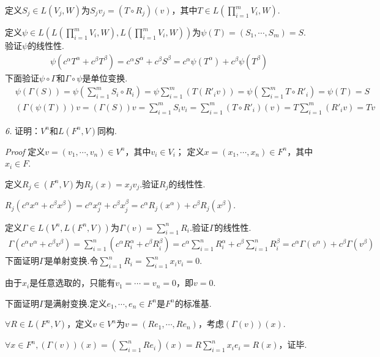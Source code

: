 定义\(S_j \in L(V_j,W)\)为\(S_jv_j=(T \circ R_j)(v)\)，其中\(T \in L(\prod_{i=1}^m V_i,W)\).

定义\(\psi \in L(L(\prod_{i=1}^m V_i,W),L(\prod_{i=1}^m V_i,W))\)为\(\psi(T)=(S_1,\cdots,S_m)=S\).验证\(\psi\)的线性性.
    \begin{align*}
        \psi(c^\alpha T^\alpha+c^\beta T^\beta)=c^\alpha S^\alpha+c^\beta S^\beta
        =c^\alpha \psi(T^\alpha)+c^\beta \psi(T^\beta)
    \end{align*}
下面验证\(\psi \circ \Gamma\)和\(\Gamma \circ \psi\)是单位变换.
    \begin{align*}
        &\psi(\Gamma(S))=\psi(\sum_{i=1}^m S_i \circ R_i)=\psi \sum_{i=1}^m (T(R'_iv))
        =\psi(\sum_{i=1}^m T \circ R'_i)=\psi(T)=S \\
        &(\Gamma(\psi(T)))v=(\Gamma(S))v=\sum_{i=1}^m S_iv_i
        =\sum_{i=1}^m (T \circ R'_i)(v)=T\sum_{i=1}^m (R'_iv)=Tv
    \end{align*}

\newpage

\textit{6.}
证明：\(V^n\)和\(L(F^n,V)\)同构.

\textit{Proof}
定义\(v=(v_1,\cdots,v_n) \in V^n\)，其中\(v_i \in V_i\)；
定义\(x=(x_1,\cdots,x_n) \in F^n\)，其中\(x_i \in F\).

定义\(R_j \in (F^n,V)\)为\(R_j(x)=x_jv_j\).验证\(R_j\)的线性性.

$R_j(c^\alpha x^\alpha+c^\beta x^\beta)=c^\alpha x_j^\alpha+c^\beta x_j^\beta
=c^\alpha R_j(x^\alpha)+c^\beta R_j(x^\beta)$.

定义\(\Gamma \in L(V^n,L(F^n,V))\)为\(\Gamma(v)=\sum_{i=1}^n R_i\).验证\(\Gamma\)的线性性.
    \begin{align*}
        \Gamma(c^\alpha v^\alpha+c^\beta v^\beta)
        =\sum_{i=1}^n (c^\alpha R_i^\alpha+c^\beta R_i^\beta)
        =c^\alpha \sum_{i=1}^n R_i^\alpha+c^\beta \sum_{i=1}^n R_i^\beta
        =c^\alpha \Gamma(v^\alpha)+c^\beta \Gamma(v^\beta)
    \end{align*}
下面证明\(\Gamma\)是单射变换.令\(\sum_{i=1}^n R_i=\sum_{i=1}^n x_iv_i=0\).

由于\(x_i\)是任意选取的，只能有\(v_1=\cdots=v_n=0\)，即\(v=0\).

下面证明\(\Gamma\)是满射变换.定义\(e_1,\cdots,e_n \in F^n\)是\(F^n\)的标准基.

\(\forall R \in L(F^n,V)\)，定义\(v \in V^n\)为\(v=(Re_1,\cdots,Re_n)\)，考虑\((\Gamma(v))(x)\).

\(\forall x \in F^n,(\Gamma(v))(x)=(\sum_{i=1}^n Re_i)(x)=R\sum_{i=1}^n x_ie_i=R(x)\)，证毕.

